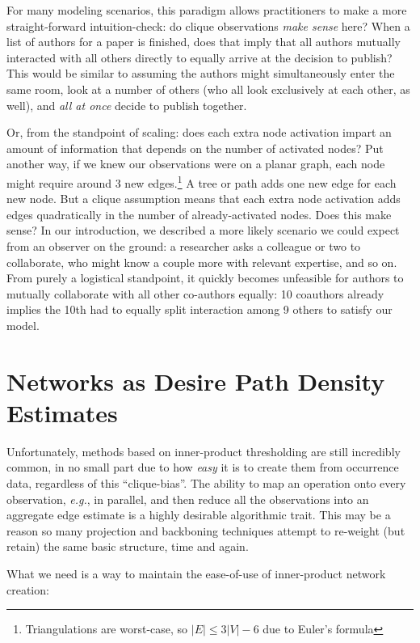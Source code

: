 \documentclass[%
	12pt,
		oneside,
		letterpaper
]{book}
\begin{document}
For many modeling scenarios, this paradigm allows practitioners to make a more straight-forward intuition-check: do clique observations \emph{make sense} here?
When a list of authors for a paper is finished, does that imply that all authors mutually interacted with all others directly to equally arrive at the decision to publish?
This would be similar to assuming the authors might simultaneously enter the same room, look at a number of others (who all look exclusively at each other, as well), and \emph{all at once} decide to publish together.

Or, from the standpoint of scaling: does each extra node activation impart an amount of information that depends on the number of activated nodes?
Put another way, if we knew our observations were on a planar graph, each node might require around 3 new edges.\footnote{Triangulations are worst-case, so \(|E|\leq 3|V|-6\) due to Euler's formula}
A tree or path adds one new edge for each new node.
But a clique assumption means that each extra node activation adds edges quadratically in the number of already-activated nodes.
Does this make sense?
In our introduction, we described a more likely scenario we could expect from an observer on the ground: a researcher asks a colleague or two to collaborate, who might know a couple more with relevant expertise, and so on.
From purely a logistical standpoint, it quickly becomes unfeasible for authors to mutually collaborate with all other co-authors equally: 10 coauthors already implies the 10th had to equally split interaction among 9 others to satisfy our model.

\section{Networks as Desire Path Density Estimates}\label{networks-as-desire-path-density-estimates}

Unfortunately, methods based on inner-product thresholding are still incredibly common, in no small part due to how \emph{easy} it is to create them from occurrence data, regardless of this ``clique-bias''.
The ability to map an operation onto every observation, \emph{e.g.}, in parallel, and then reduce all the observations into an aggregate edge estimate is a highly desirable algorithmic trait.
This may be a reason so many projection and backboning techniques attempt to re-weight (but retain) the same basic structure, time and again.

What we need is a way to maintain the ease-of-use of inner-product network creation:
\end{document}
